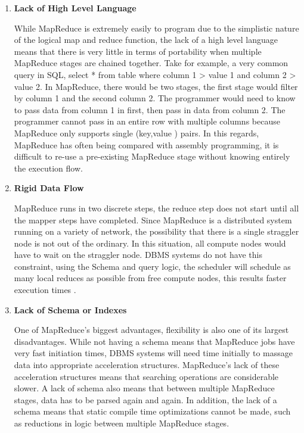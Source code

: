 \documentclass[10pt,twocolumn]{IEEEtran11}
\begin{document}
\begin {enumerate}
\setlength\itemsep{1em}
\item 

\textbf{Lack of High Level Language}

While MapReduce is extremely easily to program due to the simplistic nature of the logical map and reduce function, the lack of a high level language means that there is very little in terms of portability when multiple MapReduce stages are chained together.   Take for example, a very common query in SQL, select * from table where column 1 > value 1 and column 2 > value 2.  In MapReduce, there would be two stages, the first stage
would filter by column 1 and the second column 2.  The programmer would need to know to pass data from column 1 in first, then pass in data from column 2.  The programmer cannot pass in an entire row with multiple columns because MapReduce only supports single (key,value ) pairs.
In this regards, MapReduce has often being compared with assembly programming, it is difficult to re-use a pre-existing MapReduce stage without knowing entirely the execution flow.  
\item 

\textbf{Rigid Data Flow}

MapReduce runs in two discrete steps, the reduce step does not start until all the mapper steps have completed.  Since MapReduce is a distributed system running on a variety of network, the possibility that there is a single straggler node is not out of the ordinary.  In this situation, all compute nodes would have to wait on the straggler node.  DBMS systems do not have this constraint, using the Schema and query logic, the scheduler will schedule as many local reduces as possible from free compute nodes, this results faster execution times \cite{yang2007map}.

\item 

\textbf{Lack of Schema or Indexes}

One of MapReduce's biggest advantages, flexibility is also one of its largest disadvantages.  While not having a schema means that MapReduce jobs have very fast initiation times, DBMS systems will need time initially to massage data into appropriate acceleration structures.  MapReduce's lack of these acceleration structures means that searching operations are considerable slower.  A lack of schema also means that between multiple MapReduce stages, data has to be parsed again and again.  In addition, the lack of a schema means that static compile time optimizations cannot be made, such as reductions in logic between multiple MapReduce stages.

\end {enumerate}
\end{document}
